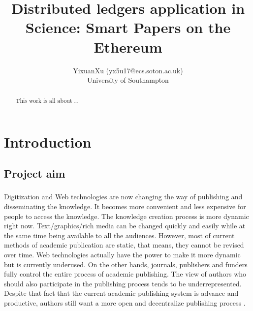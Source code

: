 \documentclass [11pt]{report}
\title{Distributed ledgers application in Science: Smart
Papers on the Ethereum}
\author{YixuanXu (yx5u17@ecs.soton.ac.uk)\\University of Southampton}
\begin{document}
\maketitle
\newpage
\tableofcontents
\newpage
\listoffigures
\newpage
\listoftables
\newpage
\begin{abstract}
	This work is all about \dots
\end{abstract}
\newpage
\chapter{Introduction}
\section{Project aim}
\paragraph{}Digitization and Web technologies are now changing the way of publishing and disseminating the knowledge.
It becomes more convenient and less expensive for people to access the knowledge. 
The knowledge creation process is more dynamic right now. 
Text/graphics/rich media can be changed quickly and easily while at the same time being available to all the audiences.
However, most of current methods of academic publication are static, that means, they cannot be revised over time\cite{heller2014dynamic}. 
Web technologies actually have the power to make it more dynamic but is currently underused. On the other hands, journals, publishers and funders fully control
the entire process of academic publishing. The view of authors who should also participate in the publishing process tends to be underrepresented. 
Despite that fact that the current academic publishing system is advance and productive, 
authors still want a more open and decentralize publishing process \cite{d2018authors}.
\end{document}

